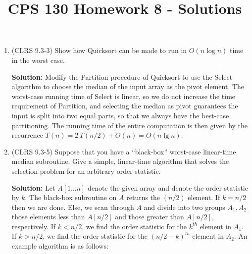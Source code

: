 \documentclass[12pt]{article}
\title{CPS 130 Homework 8 - Solutions}
\date{}
\begin{document}
\maketitle
\thispagestyle{empty}

\vspace{-2cm} 

\begin{enumerate}

\item (CLRS 9.3-3) Show how {\sc Quicksort} can be made to run in $O(n \log
  n)$ time in the worst case.

  {\bf Solution:} Modify the {\sc Partition} procedure of {\sc Quicksort}
  to use the {\sc Select} algorithm to choose the median of the input array
  as the pivot element.  The worst-case running time of {\sc Select} is
  linear, so we do not increase the time requirement of {\sc Partition},
  and selecting the median as pivot guarantees the input is split into two
  equal parts, so that we always have the best-case partitioning.  The
  running time of the entire computation is then given by the recurrence
  $T(n) = 2\,T(n/2) + O(n) = O(n\lg n)$.

\item (CLRS 9.3-5)  Suppose that you have a ``black-box'' worst-case
  linear-time median subroutine. Give a simple, linear-time algorithm that
  solves the selection problem for an arbitrary order statistic. 

  {\bf Solution:} Let $A[1 \dots n]$ denote the given array and denote the
  order statistic by $k$.  The black-box subroutine on $A$ returns the
  $(n/2)$ element.  If $k=n/2$ then we are done.  Else, we scan through $A$
  and divide into two groups $A_1,A_2$ those elements less than $A[n/2]$
  and those greater than $A[n/2]$, respectively.  If $k < n/2$, we find the
  order statistic for the $k^{th}$ element in $A_1$.  If $k > n/2$, we find
  the order statistic for the $(n/2 - k)^{th}$ element in $A_2$.  An
  example algorithm is as follows: 
 
  \begin{center}
\end{center}
\end{enumerate}
\end{document}
